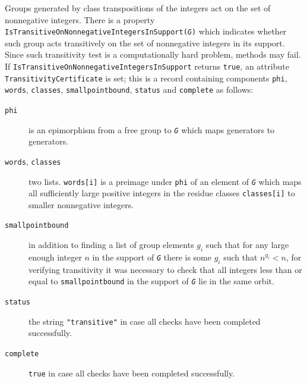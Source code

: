 \documentclass[a4paper,11pt]{report}
\begin{document}
{{
     Groups generated by class transpositions of the integers act on the set of
nonnegative integers. There is a property \texttt{IsTransitiveOnNonnegativeIntegersInSupport(\mbox{\texttt{\mdseries\slshape G}})} which indicates whether such group acts transitively on the set of nonnegative
integers in its support. Since such transitivity test is a computationally
hard problem, methods may fail. If \texttt{IsTransitiveOnNonnegativeIntegersInSupport} returns \texttt{true}, an attribute \texttt{TransitivityCertificate} is set; this is a record containing components \texttt{phi}, \texttt{words}, \texttt{classes}, \texttt{smallpointbound}, \texttt{status} and \texttt{complete} as follows: 
\begin{description}
\item[{\texttt{phi}}]  is an epimorphism from a free group to \mbox{\texttt{\mdseries\slshape G}} which maps generators to generators. 
\item[{\texttt{words}, \texttt{classes}}]  two lists. \texttt{}\texttt{} \texttt{words[i]} is a preimage under \texttt{phi} of an element of \mbox{\texttt{\mdseries\slshape G}} which maps all sufficiently large positive integers in the residue classes \texttt{classes[i]} to smaller nonnegative integers. 
\item[{\texttt{smallpointbound}}]  in addition to finding a list of group elements $g_i$ such that for any large enough integer $n$ in the support of \mbox{\texttt{\mdseries\slshape G}} there is some $g_i$ such that $n^{g_i} < n$, for verifying transitivity it was necessary to check that all integers less
than or equal to \texttt{smallpointbound} in the support of \mbox{\texttt{\mdseries\slshape G}} lie in the same orbit. 
\item[{\texttt{status}}]  the string \texttt{"transitive"} in case all checks have been completed successfully. 
\item[{\texttt{complete}}]  \texttt{true} in case all checks have been completed successfully. 

\end{description}}}
\end{document}
